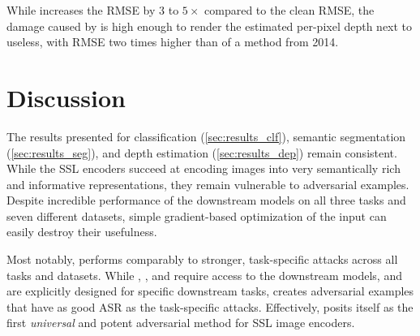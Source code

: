 While \DepthPGD increases the RMSE by $3$ to $5\times$ compared to the clean RMSE, the damage caused by \EmbedAttack is high enough to render the estimated per-pixel depth next to useless, with RMSE two times higher than of a method from 2014.


\section{Discussion}\label{sec:results_discussion}

The results presented for classification (\cref{sec:results_clf}), semantic segmentation (\cref{sec:results_seg}), and depth estimation (\cref{sec:results_dep}) remain consistent. While the SSL encoders succeed at encoding images into very semantically rich and informative representations, they remain vulnerable to adversarial examples. Despite incredible performance of the downstream models on all three tasks and seven different datasets, simple gradient-based optimization of the input can easily destroy their usefulness.

Most notably, \EmbedAttack performs comparably to stronger, task-specific attacks across all tasks and datasets. While \PGD, \SegPGD, and \DepthPGD require access to the downstream models, and are explicitly designed for specific downstream tasks, \EmbedAttack creates adversarial examples that have as good ASR as the task-specific attacks. Effectively, \EmbedAttack posits itself as the first \textit{universal} and potent adversarial method for SSL image encoders. 